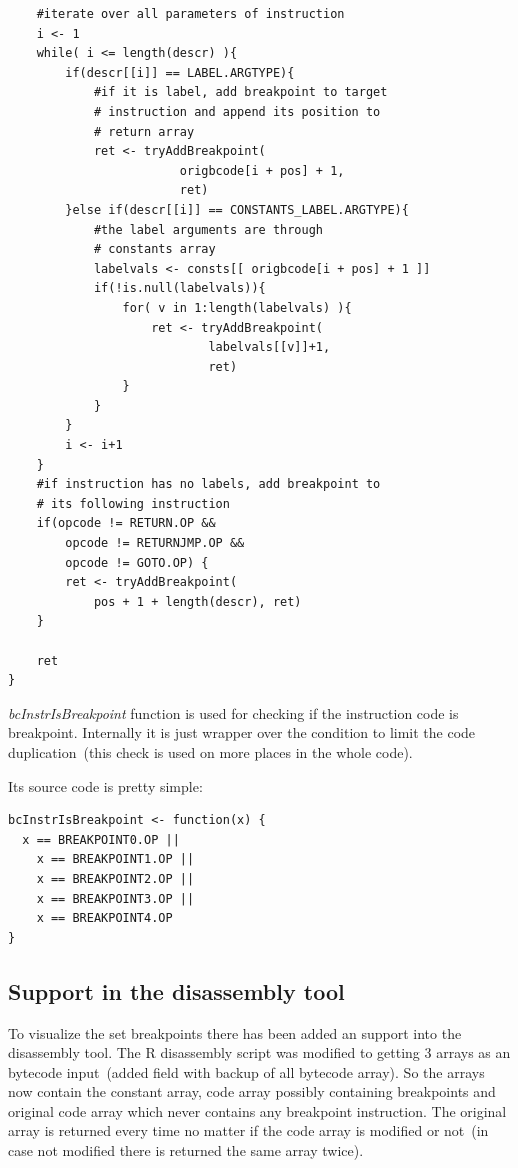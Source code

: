 \documentclass[thesis=M,english]{FITthesis}[2018/10/20]
\begin{document}
\begin{lstlisting}
    #iterate over all parameters of instruction
    i <- 1
    while( i <= length(descr) ){
        if(descr[[i]] == LABEL.ARGTYPE){
            #if it is label, add breakpoint to target
            # instruction and append its position to 
            # return array
            ret <- tryAddBreakpoint(
            			origbcode[i + pos] + 1, 
            			ret)
        }else if(descr[[i]] == CONSTANTS_LABEL.ARGTYPE){
            #the label arguments are through 
            # constants array
            labelvals <- consts[[ origbcode[i + pos] + 1 ]]
            if(!is.null(labelvals)){
                for( v in 1:length(labelvals) ){
                    ret <- tryAddBreakpoint(
                    		labelvals[[v]]+1, 
                    		ret)
                }
            }
        }
        i <- i+1
    }
    #if instruction has no labels, add breakpoint to 
    # its following instruction
    if(opcode != RETURN.OP && 
    	opcode != RETURNJMP.OP && 
    	opcode != GOTO.OP) {
        ret <- tryAddBreakpoint(
        	pos + 1 + length(descr), ret)
    }

    ret
}
\end{lstlisting}

\textit{bcInstrIsBreakpoint} function is used for checking if the instruction code is breakpoint. Internally it is just wrapper over the condition to limit the code duplication~(this check is used on more places in the whole code).

Its source code is pretty simple:

\begin{lstlisting}
bcInstrIsBreakpoint <- function(x) {
  x == BREAKPOINT0.OP ||
    x == BREAKPOINT1.OP ||
    x == BREAKPOINT2.OP ||
    x == BREAKPOINT3.OP ||
    x == BREAKPOINT4.OP
}
\end{lstlisting}

\subsection{Support in the disassembly tool}\label{debugger-support-in-disassembly}

To visualize the set breakpoints there has been added an support into the disassembly tool. The R disassembly script was modified to getting 3 arrays as an bytecode input~(added field with backup of all bytecode array). So the arrays now contain the constant array, code array possibly containing breakpoints and original code array which never contains any breakpoint instruction. The original array is returned every time no matter if the code array is modified or not~(in case not modified there is returned the same array twice). 
\end{document}
